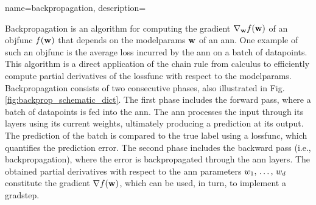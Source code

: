  {name={backpropagation},
 	description={Backpropagation is an \gls{algorithm} for computing the \gls{gradient} 
	 	$\nabla_{{\bf w}} f({\bf w})$ of an \gls{objfunc} $f({\bf w})$ that depends on the 
	  	\gls{modelparams} ${\bf w}$ of an \gls{ann}. One example of such an \gls{objfunc} 
	  	is the average \gls{loss} incurred by the \gls{ann} on a \gls{batch} of \glspl{datapoint}. 
	  	This \gls{algorithm} is a direct application of the chain rule from calculus to 
	  	efficiently compute partial derivatives of the \gls{lossfunc} with respect to the \gls{modelparams}.
		Backpropagation consists of two consecutive phases, also illustrated in Fig. \ref{fig:backprop_schematic_dict}. 
		The first phase includes the forward pass, where a \gls{batch} of 
		\glspl{datapoint} is fed into the \gls{ann}. The \gls{ann} processes the input through its \glspl{layer} using its current 
		\gls{weights}, ultimately producing a \gls{prediction} at its output. The \gls{prediction} of the \gls{batch} is compared to 
	   	the true \gls{label} using a \gls{lossfunc}, which quantifies the \gls{prediction} error. The second phase includes the 
		backward pass (i.e., backpropagation), where the error is backpropagated through the \gls{ann} \glspl{layer}. 
	   	The obtained partial derivatives with respect to the \gls{ann} \glspl{parameter} $w_{1},\,\ldots,\,w_{d}$ 
	   	constitute the \gls{gradient} $\nabla f({\bf w})$, which can be used, in turn, to implement a \gls{gradstep}.
	   	\begin{figure}[H]
		\centering
\end{figure}}}
